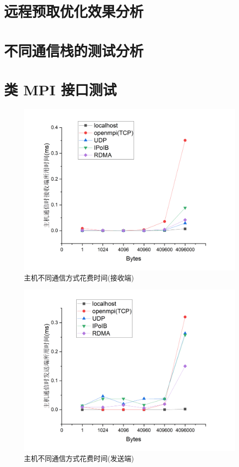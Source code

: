 {\section{远程预取优化效果分析}

\section{不同通信栈的测试分析}

\section{类 MPI 接口测试}
\begin{figure}[H]
    \centering
    \includegraphics[width=1.0\textwidth]{Img/recv_perf.png}
    \caption{主机不同通信方式花费时间(接收端)}
\end{figure}

\begin{figure}[H]
    \centering
    \includegraphics[width=1.0\textwidth]{Img/send_perf.png}
    \caption{主机不同通信方式花费时间(发送端)}
\end{figure}

}

